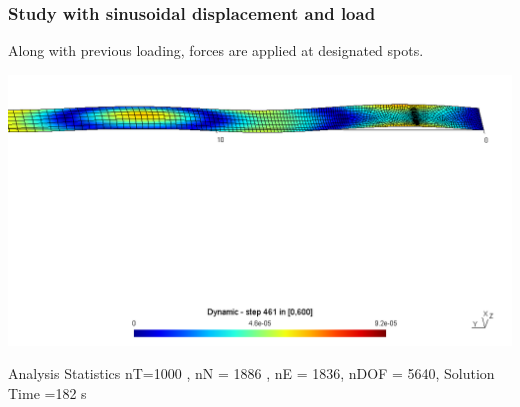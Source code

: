 \documentclass[9pt]{beamer}
\begin{document}
\begin{frame}\frametitle{Study with sinusoidal displacement and load }
Along with previous loading, forces are applied at designated spots.

\begin{figure}[h!]
\centering

\end{figure}
\href{run:movie2.mpg}{\includegraphics[width=1.0\textwidth,trim={0cm 15cm 0cm 1cm},clip]{ParaStudy_onlydata/for.png}}



\begin{block}{Analysis Statistics}
nT=1000 , nN = 1886 , nE = 1836, nDOF = 5640, Solution Time =182 s

\end{block}


\end{frame}
\end{document}
